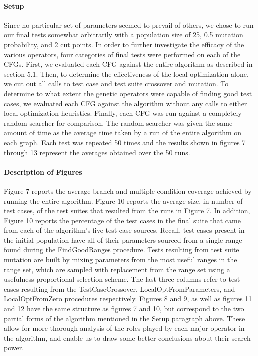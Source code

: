 \documentclass[runningheads]{llncs}
\begin{document}
\paragraph{Setup}Since no particular set of parameters seemed to prevail of others, we chose to run our final tests somewhat arbitrarily with a population size of 25, 0.5 mutation probability, and 2 cut points. In order to further investigate the efficacy of the various operators, four categories of final tests were performed on each of the CFGs. First, we evaluated each CFG against the entire algorithm as described in section 5.1. Then, to determine the effectiveness of the local optimization alone, we cut out all calls to test case and test suite crossover and mutation. To determine to what extent the genetic operators were capable of finding good test cases, we evaluated each CFG against the algorithm without any calls to either local optimization heuristics. Finally, each CFG was run against a completely random searcher for comparison. The random searcher was given the same amount of time as the average time taken by a run of the entire algorithm on each graph. Each test was repeated 50 times and the results shown in figures 7 through 13 represent the averages obtained over the 50 runs. 

\paragraph{Description of Figures} Figure 7 reports the average branch and multiple condition coverage achieved by running the entire algorithm. Figure 10 reports the average size, in number of test cases, of the test suites that resulted from the runs in Figure 7. In addition, Figure 10 reports the percentage of the test cases in the final suite that came from each of the algorithm's five test case sources. Recall, test cases present in the initial population have all of their parameters sourced from a single range found during the FindGoodRanges procedure. Tests resulting from test suite mutation are built by mixing parameters from the most useful ranges in the range set, which are sampled with replacement from the range set using a usefulness proportional selection scheme. The last three columns refer to test cases resulting from the TestCaseCrossover, LocalOptFromParameters, and LocalOptFromZero procedures respectively. Figures 8 and 9, as well as figures 11 and 12 have the same structure as figures 7 and 10, but correspond to the two partial forms of the algorithm mentioned in the Setup paragraph above. These allow for more thorough analysis of the roles played by each major operator in the algorithm, and enable us to draw some better conclusions about their search power.
\end{document}
